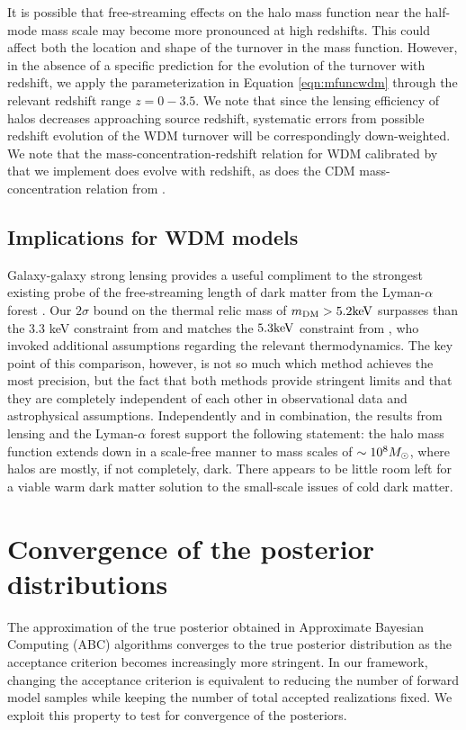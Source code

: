 It is possible that free-streaming effects on the halo mass function near the half-mode mass scale may become more pronounced at high redshifts. This could affect both the location and shape of the turnover in the mass function. However, in the absence of a specific prediction for the evolution of the turnover with redshift, we apply the parameterization in Equation \ref{eqn:mfuncwdm} through the relevant redshift range $z = 0 - 3.5$. We note that since the lensing efficiency of halos decreases approaching source redshift, systematic errors from possible redshift evolution of the WDM turnover will be correspondingly down-weighted. We note that the mass-concentration-redshift relation for WDM calibrated by \cite{Bose++16} that we implement does evolve with redshift, as does the CDM mass-concentration relation from \cite{DiemerJoyce18}. 

\subsection{Implications for WDM models}
\label{ssec:implications}

Galaxy-galaxy strong lensing provides a useful compliment to the strongest existing probe of the free-streaming length of dark matter from the Lyman-$\alpha$ forest \cite{Viel13,Irsic++17}. Our $2 \sigma$ bound on the thermal relic mass of $m_{\rm{DM}} > 5.2 \rm{keV}$ surpasses than the 3.3 keV constraint from \cite{Viel13} and matches the $5.3 \rm{keV}$ constraint from \cite{Irsic++17}, who invoked additional assumptions regarding the relevant thermodynamics. The key point of this comparison, however, is not so much which method achieves the most precision, but the fact that both methods provide stringent limits and that they are completely independent of each other in observational data and astrophysical assumptions. Independently and in combination, the results from lensing and the Lyman-$\alpha$ forest support the following statement: the halo mass function extends down in a scale-free manner to mass scales of $\sim 10^{8} {M_{\odot}}$, where halos are mostly, if not completely, dark. There appears to be little room left for a viable warm dark matter solution to the small-scale issues of cold dark matter. 

	\section{\bf Convergence of the posterior distributions}
\label{app:A}
The approximation of the true posterior obtained in Approximate Bayesian Computing (ABC) algorithms converges to the true posterior distribution as the acceptance criterion becomes increasingly more stringent. In our framework, changing the acceptance criterion is equivalent to reducing the number of forward model samples while keeping the number of total accepted realizations fixed. We exploit this property to test for convergence of the posteriors. 

